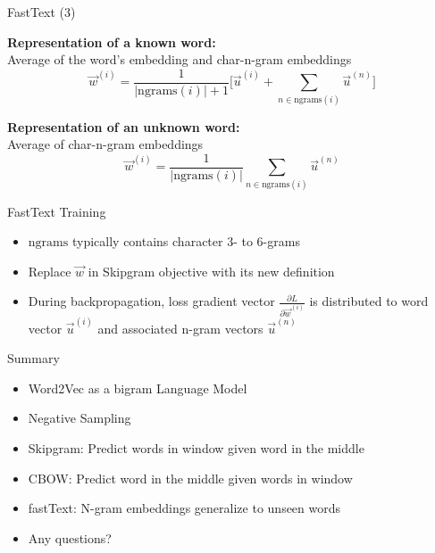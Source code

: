 
\begin{vbframe}{FastText (3)}

\vfill

\textbf{Representation of a known word:}\\ Average of the word's embedding and char-n-gram embeddings
$$\vec w^{(i)} = \frac{1}{|\mathrm{ngrams}(i)| + 1} \Big[ \vec u^{(i)} + \sum_{n \in \mathrm{ngrams}(i)} \vec u^{(n)} \Big]$$

\textbf{Representation of an unknown word:}\\ Average of char-n-gram embeddings
$$\vec w^{(i)} = \frac{1}{|\mathrm{ngrams}(i)|} \sum_{n \in \mathrm{ngrams}(i)} \vec u^{(n)}$$


\vfill

\end{vbframe}


\begin{vbframe}{FastText Training}

\vfill

\begin{itemize}
\item $\mathrm{ngrams}$ typically contains character 3- to 6-grams
\item Replace $\vec w$ in Skipgram objective with its new definition
\item During backpropagation, loss gradient vector $\frac{\partial L}{\partial \vec w^{(i)}}$ is distributed to word vector $\vec u^{(i)}$ and associated n-gram vectors $\vec u^{(n)}$
\end{itemize}

\vfill

\end{vbframe}


\begin{vbframe}{Summary}

\vfill

\begin{itemize}
	\item Word2Vec as a bigram Language Model
	\item Negative Sampling
	\item Skipgram: Predict words in window given word in the middle
	\item CBOW: Predict word in the middle given words in window
	\item fastText: N-gram embeddings generalize to unseen words
	\item Any questions?
\end{itemize}

\vfill

\end{vbframe}

